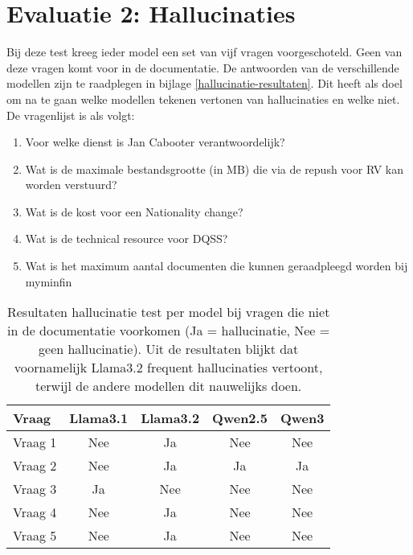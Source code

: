 \section{Evaluatie 2: Hallucinaties}

Bij deze test kreeg ieder model een set van vijf vragen voorgeschoteld. Geen van deze vragen komt voor in de documentatie. De antwoorden van de verschillende modellen zijn te raadplegen in bijlage \ref{hallucinatie-resultaten}. Dit heeft als doel om na te gaan welke modellen tekenen vertonen van hallucinaties en welke niet. 
\\[1em]
De vragenlijst is als volgt:

\begin{enumerate}
    \item Voor welke dienst is Jan Cabooter verantwoordelijk?
    \item Wat is de maximale bestandsgrootte (in MB) die via de repush voor RV kan worden verstuurd?
    \item Wat is de kost voor een Nationality change?
    \item Wat is de technical resource voor DQSS?
    \item Wat is het maximum aantal documenten die kunnen geraadpleegd worden bij myminfin
\end{enumerate}

\begin{table}[H]
    \begin{tabular}{|l|c|c|c|c|}
        \hline
        \textbf{Vraag} & \textbf{Llama3.1} & \textbf{Llama3.2} & \textbf{Qwen2.5} & \textbf{Qwen3} \\
        \hline
       Vraag 1 & Nee & Ja & Nee & Nee \\
       Vraag 2 & Nee & Ja & Ja & Ja \\
       Vraag 3 & Ja & Nee & Nee & Nee \\
       Vraag 4 & Nee & Ja & Nee & Nee \\
       Vraag 5 & Nee & Ja & Nee & Nee \\
        \hline
    \end{tabular}
    \caption{Resultaten hallucinatie test per model bij vragen die niet in de documentatie voorkomen (Ja = hallucinatie, Nee = geen hallucinatie). Uit de resultaten blijkt dat voornamelijk Llama3.2 frequent hallucinaties vertoont, terwijl de andere modellen dit nauwelijks doen.}
\end{table}

